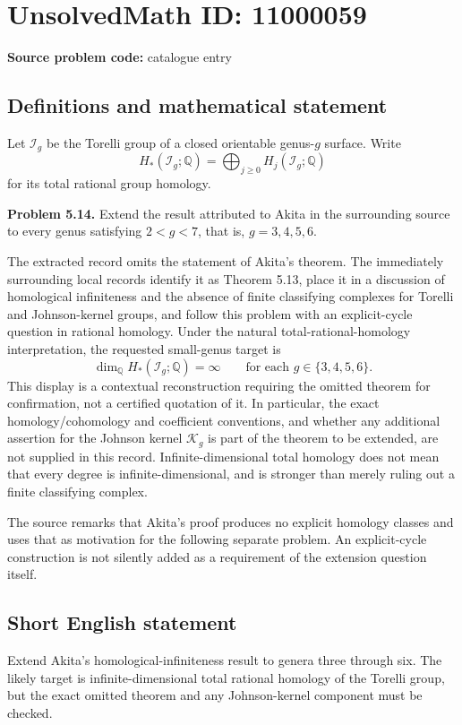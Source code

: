 \documentclass[11pt]{article}
\newcommand{\Q}{\mathbb{Q}}
\begin{document}
\section*{UnsolvedMath ID: 11000059}
\textbf{Source problem code:} catalogue entry
\subsection{Definitions and mathematical statement}
Let $\mathcal I_g$ be the Torelli group of a closed orientable genus-$g$ surface. Write
\[
 H_*(\mathcal I_g;\Q)=\bigoplus_{j\ge0}H_j(\mathcal I_g;\Q)
\]
for its total rational group homology.

\textbf{Problem 5.14.} Extend the result attributed to Akita in the surrounding source to every genus satisfying $2<g<7$, that is, $g=3,4,5,6$.

The extracted record omits the statement of Akita's theorem. The immediately surrounding local records identify it as Theorem 5.13, place it in a discussion of homological infiniteness and the absence of finite classifying complexes for Torelli and Johnson-kernel groups, and follow this problem with an explicit-cycle question in rational homology. Under the natural total-rational-homology interpretation, the requested small-genus target is
\[
 \dim_{\Q}H_*(\mathcal I_g;\Q)=\infty
 \qquad\text{for each }g\in\{3,4,5,6\}.
\]
This display is a contextual reconstruction requiring the omitted theorem for confirmation, not a certified quotation of it. In particular, the exact homology/cohomology and coefficient conventions, and whether any additional assertion for the Johnson kernel $\mathcal K_g$ is part of the theorem to be extended, are not supplied in this record. Infinite-dimensional total homology does not mean that every degree is infinite-dimensional, and is stronger than merely ruling out a finite classifying complex.

The source remarks that Akita's proof produces no explicit homology classes and uses that as motivation for the following separate problem. An explicit-cycle construction is not silently added as a requirement of the extension question itself.
\subsection{Short English statement}
Extend Akita's homological-infiniteness result to genera three through six. The likely target is infinite-dimensional total rational homology of the Torelli group, but the exact omitted theorem and any Johnson-kernel component must be checked.
\end{document}
